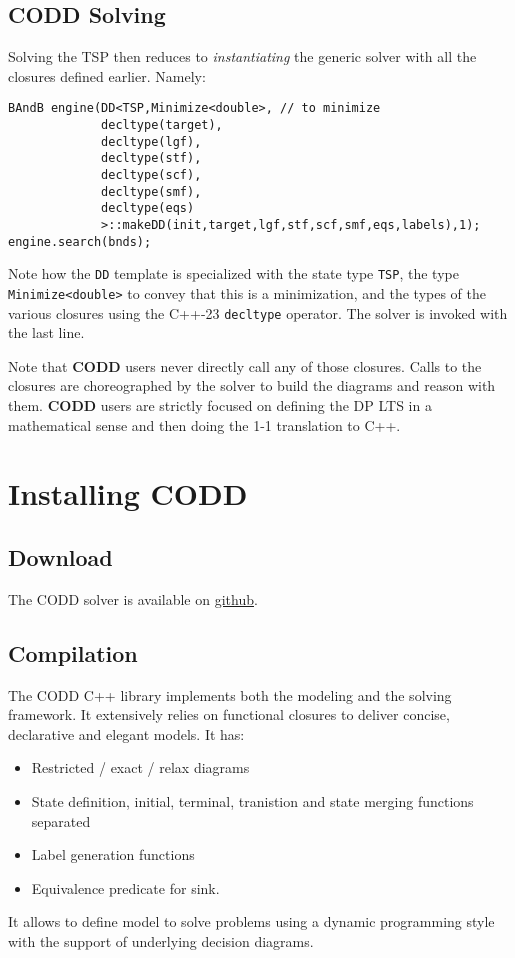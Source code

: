 \documentclass[11pt]{article}
\begin{document}
\subsection{\textbf{CODD} Solving}
\label{sec:org64d2198}
Solving the TSP then reduces to \emph{instantiating} the generic solver with all the closures defined earlier. Namely:
\begin{verbatim}
BAndB engine(DD<TSP,Minimize<double>, // to minimize
             decltype(target),
             decltype(lgf),
             decltype(stf),
             decltype(scf),
             decltype(smf),
             decltype(eqs)
             >::makeDD(init,target,lgf,stf,scf,smf,eqs,labels),1);
engine.search(bnds);
\end{verbatim}
Note how the \texttt{DD} template is specialized with the state type \texttt{TSP}, the type
\texttt{Minimize<double>} to convey that this is a minimization, and the types of the various
closures using the C++-23 \texttt{decltype} operator. The solver is invoked with the last line.
\begin{important}
Note that \textbf{CODD} users never directly call any of those closures. Calls to the closures are
choreographed by the solver to build the diagrams and reason with them. \textbf{CODD} users are strictly focused on defining the DP LTS in a mathematical sense and then doing the 1-1 translation to C++. 
\end{important}

\section{Installing CODD}
\label{sec:org9276b22}
\subsection{Download}
\label{sec:org2d6e52d}
The CODD solver is available on \href{https://github.com/ldmbouge/CPPddOpt}{github}. 
\subsection{Compilation}
\label{sec:org1f3f1c6}
The CODD C++ library implements both the modeling and the solving framework. It extensively
relies on functional closures to deliver concise, declarative and elegant models.
It has:
\begin{itemize}
\item Restricted / exact / relax diagrams
\item State definition, initial, terminal, tranistion and state merging functions separated
\item Label generation functions
\item Equivalence predicate for sink.
\end{itemize}
It allows to define model to solve problems using a dynamic programming style with the
support of underlying decision diagrams.
\end{document}
